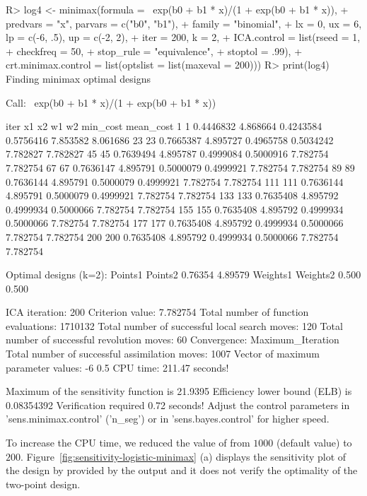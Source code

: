   \begin{example}
R> log4 <- minimax(formula = ~exp(b0 + b1 * x)/(1 + exp(b0 + b1 * x)),
+                 predvars = "x", parvars = c("b0", "b1"),
+                 family = "binomial",
+                 lx = 0, ux = 6, lp = c(-6, .5), up = c(-2, 2),
+                 iter = 200, k = 2,
+                 ICA.control = list(rseed = 1,
+                                    checkfreq = 50,
+                                    stop_rule = "equivalence",
+                                    stoptol = .99),
+                 crt.minimax.control = list(optslist = list(maxeval = 200)))
R> print(log4)
Finding  minimax optimal designs

Call:
  ~exp(b0 + b1 * x)/(1 + exp(b0 + b1 * x))

iter        x1       x2        w1        w2 min_cost mean_cost
1      1 0.4446832 4.868664 0.4243584 0.5756416 7.853582  8.061686
23    23 0.7665387 4.895727 0.4965758 0.5034242 7.782827  7.782827
45    45 0.7639494 4.895787 0.4999084 0.5000916 7.782754  7.782754
67    67 0.7636147 4.895791 0.5000079 0.4999921 7.782754  7.782754
89    89 0.7636144 4.895791 0.5000079 0.4999921 7.782754  7.782754
111  111 0.7636144 4.895791 0.5000079 0.4999921 7.782754  7.782754
133  133 0.7635408 4.895792 0.4999934 0.5000066 7.782754  7.782754
155  155 0.7635408 4.895792 0.4999934 0.5000066 7.782754  7.782754
177  177 0.7635408 4.895792 0.4999934 0.5000066 7.782754  7.782754
200  200 0.7635408 4.895792 0.4999934 0.5000066 7.782754  7.782754

Optimal designs (k=2):
  Points1 Points2
0.76354 4.89579
Weights1 Weights2
0.500   0.500

ICA iteration: 200
Criterion value:  7.782754
Total number of function evaluations: 1710132
Total number of successful local search moves: 120
Total number of successful revolution moves: 60
Convergence: Maximum_Iteration
Total number of successful assimilation moves: 1007
Vector of maximum parameter values:  -6 0.5
CPU time: 211.47  seconds!
  
  Maximum of the sensitivity function is  21.9395
Efficiency lower bound (ELB) is  0.08354392
Verification required 0.72 seconds!
  Adjust the control parameters in 'sens.minimax.control' ('n_seg')
or in 'sens.bayes.control' for higher speed.
\end{example}
To increase the CPU time, we reduced the value of  from $1000$ (default value) to $200$.
Figure~\ref{fig:sensitivity-logistic-minimax} (a) displays the sensitivity plot of the design by provided by the output and it does not verify  the optimality of the two-point design.
